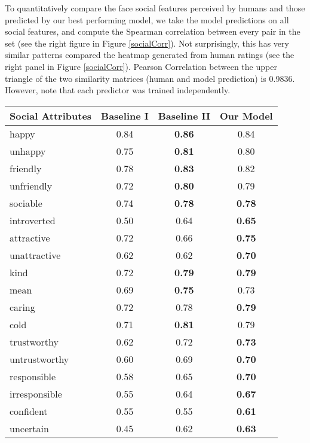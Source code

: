 \documentclass[10pt,twocolumn,letterpaper]{article}
\begin{document}
To quantitatively compare the face social features perceived by humans and those predicted by our best performing model, we take the model predictions on all social features, and compute the Spearman correlation between every pair in the set (see the right figure in Figure \ref{socialCorr}). Not surprisingly, this has very similar patterns compared the heatmap generated from human ratings (see the right panel in Figure \ref{socialCorr}). Pearson Correlation between the upper triangle of the two similarity matrices (human and model prediction) is 0.9836. However, note that each predictor was trained independently.


\begin{center}
\begin{table}[hbt]{\small
\centering 
\begin{tabular}{|l||c|c|c|}
\hline
\textbf{Social Attributes}& \textbf{Baseline I} & \textbf{Baseline II} & \textbf{Our Model}\\
\hline
happy & 0.84 &\textbf{0.86} & 0.84\\ 
\hline
unhappy & 0.75 & \textbf{0.81} & 0.80\\ 
\hline
friendly & 0.78 &\textbf{0.83} & 0.82\\ 
\hline
unfriendly & 0.72 & \textbf{0.80} & 0.79\\ 
\hline
sociable& 0.74 &\textbf{0.78} & \textbf{0.78}\\ 
\hline
introverted& 0.50 & 0.64 & \textbf{0.65}\\ 
\hline
attractive & 0.72 & 0.66 & \textbf{0.75}\\
\hline
unattractive & 0.62 & 0.62& \textbf{0.70}\\
\hline
kind& 0.72 & \textbf{0.79} & \textbf{0.79}\\ 
\hline
mean& 0.69& \textbf{0.75} & 0.73\\ 
\hline
caring& 0.72 & 0.78 & \textbf{0.79}\\
\hline
cold& 0.71 &\textbf{0.81} & 0.79\\
\hline
trustworthy&0.62 & 0.72 & \textbf{0.73}\\
\hline
untrustworthy&0.60 & 0.69 & \textbf{0.70}\\
\hline
responsible&0.58 &0.65 & \textbf{0.70}\\
\hline
irresponsible&0.55 &0.64& \textbf{0.67}\\
\hline
confident&0.55& 0.55& \textbf{0.61}\\
\hline
uncertain&0.45& 0.62 & \textbf{0.63}\\

\end{tabular}}
\end{table}
\end{center}
\end{document}
